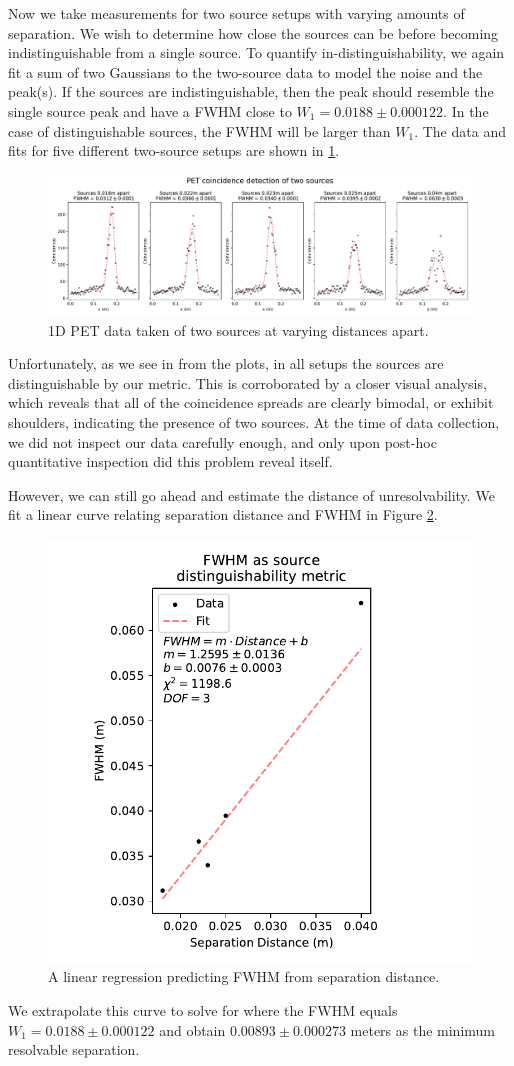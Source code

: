 \documentclass[12pt, letterpaper]{article}
\begin{document}
Now we take measurements for two source setups with varying amounts of separation. We wish to determine how close the sources can be before becoming indistinguishable from a single source. To quantify in-distinguishability, we again fit a sum of two Gaussians to the two-source data to model the noise and the peak(s). If the sources are indistinguishable, then the peak should resemble the single source peak and have a FWHM close to $W_1 = 0.0188 \pm 0.000122$. In the case of distinguishable sources, the FWHM will be larger than $W_1$. The data and fits for five different two-source setups are shown in \ref{fig:two_source}. 
\begin{figure}
    \centering
    \includegraphics[width=1\linewidth]{experiment5/figures/two_sources.pdf}
    \caption{1D PET data taken of two sources at varying distances apart. }
    \label{fig:two_source}
\end{figure}

Unfortunately, as we see in from the plots, in all setups the sources are distinguishable by our metric. This is corroborated by a closer visual analysis, which reveals that all of the coincidence spreads are clearly bimodal, or exhibit shoulders, indicating the presence of two sources. At the time of data collection, we did not inspect our data carefully enough, and only upon post-hoc quantitative inspection did this problem reveal itself. 

However, we can still go ahead and estimate the distance of unresolvability. We fit a linear curve relating separation distance and FWHM in Figure \ref{fig:separation}. 
\begin{figure}
    \centering
    \includegraphics[width=0.5\linewidth]{experiment5/figures/separation.pdf}
    \caption{A linear regression predicting FWHM from separation distance. }
    \label{fig:separation}
\end{figure}
We extrapolate this curve to solve for where the FWHM equals $W_1 = 0.0188 \pm 0.000122$ and obtain $0.00893 \pm 0.000273$ meters as the minimum resolvable separation. 
\end{document}
